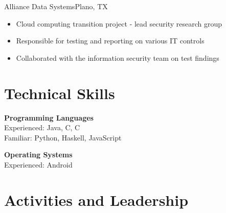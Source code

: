 \documentclass[11pt,a4paper,sans]{moderncv}
\newcommand{\Rplus}{\protect\hspace{-.1em}\protect\raisebox{.35ex}{\smaller{\smaller\textbf{+}}}}
\newcommand{\Cpp}{\mbox{C\Rplus\Rplus}\xspace}
\newcommand{\spacing}{4pt}
\begin{document}
\vspace{\spacing}

  {Alliance Data Systems}{Plano, TX}{}{\vspace{3pt}
    \begin{itemize}
      \setlength{\itemindent}{1em}
      \item Cloud computing transition project - lead security research group
      \item Responsible for testing and reporting on various IT controls
      \item Collaborated with the information security team on test findings
    \end{itemize}
    }

\section{Technical Skills}

\vspace{-.75em}

\begin{multicols}{2}
\noindent

\textbf{Programming Languages} \\
  Experienced: Java, \Cpp, C \\
  Familiar: Python, Haskell, JavaScript

\textbf{Operating Systems} \\
  Experienced: Android

\end{multicols}

\vspace{-1.5em}

\section{Activities and Leadership}

\vspace{\spacing}

\addvspace{-1em}


\addvspace{-1.25em}


\addvspace{-1.25em}

\end{document}
